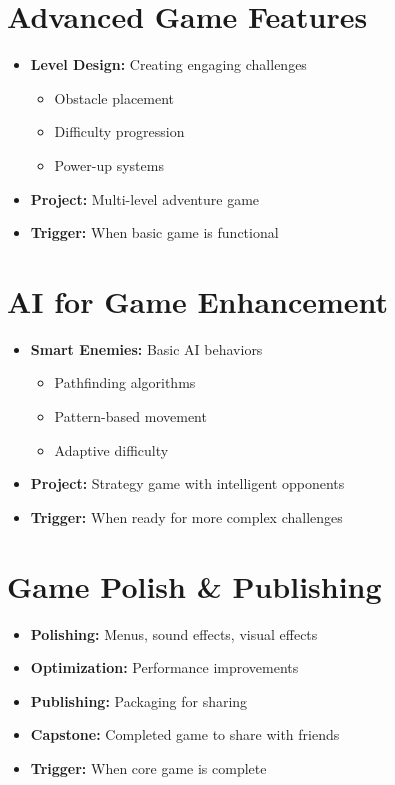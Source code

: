 \documentclass{article}
\begin{document}
\section{Advanced Game Features}
\begin{itemize}[nosep]
    \item \textbf{Level Design:} Creating engaging challenges
    \begin{itemize}
        \item Obstacle placement
        \item Difficulty progression
        \item Power-up systems
    \end{itemize}
    \item \textbf{Project:} Multi-level adventure game
    \item \textbf{Trigger:} When basic game is functional
\end{itemize}

\section{AI for Game Enhancement}
\begin{itemize}[nosep]
    \item \textbf{Smart Enemies:} Basic AI behaviors
    \begin{itemize}
        \item Pathfinding algorithms
        \item Pattern-based movement
        \item Adaptive difficulty
    \end{itemize}
    \item \textbf{Project:} Strategy game with intelligent opponents
    \item \textbf{Trigger:} When ready for more complex challenges
\end{itemize}

\section{Game Polish \& Publishing}
\begin{itemize}[nosep]
    \item \textbf{Polishing:} Menus, sound effects, visual effects
    \item \textbf{Optimization:} Performance improvements
    \item \textbf{Publishing:} Packaging for sharing
    \item \textbf{Capstone:} Completed game to share with friends
    \item \textbf{Trigger:} When core game is complete
\end{itemize}
\end{document}
